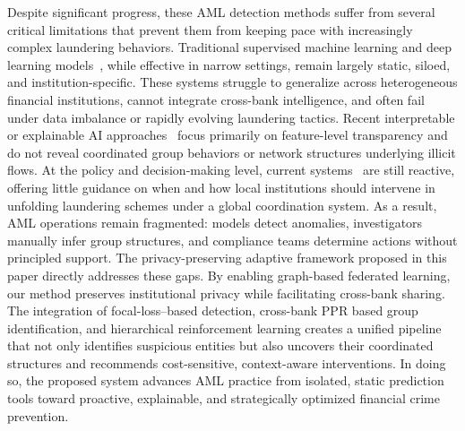 Despite significant progress, these AML detection methods suffer from several critical limitations that prevent them from keeping pace with increasingly complex laundering behaviors. Traditional supervised machine learning and deep learning models~\parencite{pettersson2022combating, alotibi2022money, jensen2023fighting, lokanan2024predicting, chen2018machine}, while effective in narrow settings, remain largely static, siloed, and institution-specific. These systems struggle to generalize across heterogeneous financial institutions, cannot integrate cross-bank intelligence, and often fail under data imbalance or rapidly evolving laundering tactics. Recent interpretable or explainable AI approaches~\parencite{chen2018machine, han2020artificial, kute2024explainable, kute2022explainable} focus primarily on feature-level transparency and do not reveal coordinated group behaviors or network structures underlying illicit flows. At the policy and decision-making level, current systems~\parencite{ross2007money, unger2009dodge, helgesson2016involuntary, mccarthy2015modeling} are still reactive, offering little guidance on when and how local institutions should intervene in unfolding laundering schemes under a global coordination system. As a result, AML operations remain fragmented: models detect anomalies, investigators manually infer group structures, and compliance teams determine actions without principled support. The privacy-preserving adaptive framework proposed in this paper directly addresses these gaps. By enabling graph-based federated learning, our method preserves institutional privacy while facilitating cross-bank sharing. The integration of focal-loss–based detection, cross-bank PPR based group identification, and hierarchical reinforcement learning creates a unified pipeline that not only identifies suspicious entities but also uncovers their coordinated structures and recommends cost-sensitive, context-aware interventions. In doing so, the proposed system advances AML practice from isolated, static prediction tools toward proactive, explainable, and strategically optimized financial crime prevention.


